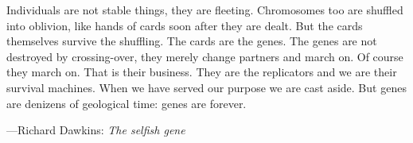 \epigraph{Individuals are not stable things, they are fleeting. Chromosomes too
are shuffled into oblivion, like hands of cards soon after they are dealt. But
the cards themselves survive the shuffling. The cards are the genes. The genes
are not destroyed by crossing-over, they merely change partners and march on.
Of course they march on. That is their business. They are the replicators and
we are their survival machines. When we have served our purpose we are cast
aside. But genes are denizens of geological time: genes are forever.}
{---Richard Dawkins: \emph{The selfish gene}}
